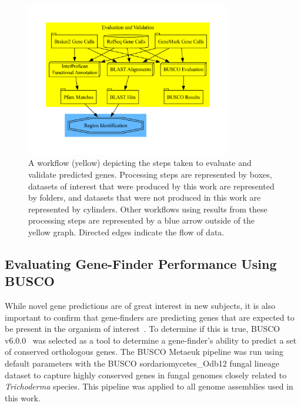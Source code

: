\begin{figure}
  \centering
  \includegraphics[width=0.8\textwidth]{figures/eval-met.pdf}
  \caption[Gene evaluation and validation workflow]{A workflow (yellow) depicting the steps taken to evaluate
    and validate predicted genes. Processing steps are represented by
    boxes, datasets of interest that were produced by this work are
    represented by folders, and datasets that were not produced in
    this work are represented by cylinders. Other workflows using
    results from these processing steps are represented by a
    blue arrow outside of the yellow graph. Directed edges
    indicate the flow of data.}
  \label{fig:valid}
\end{figure}

\subsection{Evaluating Gene-Finder Performance Using BUSCO}
\label{met:busco}
While novel gene predictions are of great interest in new subjects, it
is also important to confirm that gene-finders are predicting genes
that are expected to be present in the organism of
interest~\cite{manni2021b}. To determine if this
is true, BUSCO v6.0.0~\cite{simao2015a} was selected
as a tool to determine a gene-finder's ability to predict a set of
conserved orthologous genes. The BUSCO Metaeuk pipeline was run using default parameters with the BUSCO sordariomycetes\_Odb12 fungal lineage dataset to capture highly
conserved genes in fungal genomes closely related to \textit{Trichoderma} species. This pipeline was applied to all
genome assemblies used in this work.

